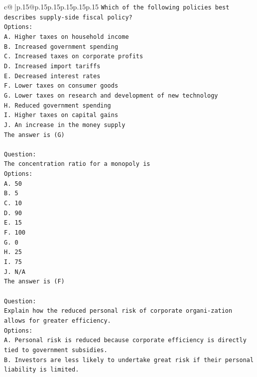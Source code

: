 \documentclass{article}
\begin{document}
{\begin{supertabular}{c@{$\;$}|p{.15\linewidth}@{}p{.15\linewidth}p{.15\linewidth}p{.15\linewidth}p{.15\linewidth}p{.15\linewidth}}
{{{\texttt{Which of the following policies best describes supply{-}side fiscal policy?} \\
\texttt{Options:} \\
\texttt{A. Higher taxes on household income} \\
\texttt{B. Increased government spending} \\
\texttt{C. Increased taxes on corporate profits} \\
\texttt{D. Increased import tariffs} \\
\texttt{E. Decreased interest rates} \\
\texttt{F. Lower taxes on consumer goods} \\
\texttt{G. Lower taxes on research and development of new technology} \\
\texttt{H. Reduced government spending} \\
\texttt{I. Higher taxes on capital gains} \\
\texttt{J. An increase in the money supply} \\
\texttt{The answer is (G)} \\
\\ 
\texttt{Question:} \\
\texttt{The concentration ratio for a monopoly is} \\
\texttt{Options:} \\
\texttt{A. 50} \\
\texttt{B. 5} \\
\texttt{C. 10} \\
\texttt{D. 90} \\
\texttt{E. 15} \\
\texttt{F. 100} \\
\texttt{G. 0} \\
\texttt{H. 25} \\
\texttt{I. 75} \\
\texttt{J. N/A} \\
\texttt{The answer is (F)} \\
\\ 
\texttt{Question:} \\
\texttt{Explain how the reduced personal risk of corporate organi{-}zation allows for greater efficiency.} \\
\texttt{Options:} \\
\texttt{A. Personal risk is reduced because corporate efficiency is directly tied to government subsidies.} \\
\texttt{B. Investors are less likely to undertake great risk if their personal liability is limited.} \\
}}}
\end{supertabular}}
\end{document}
